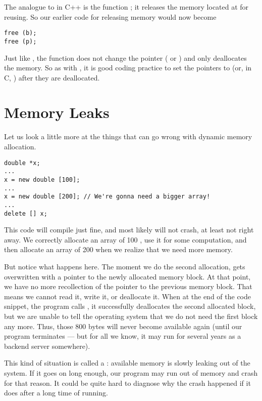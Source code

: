 \smallskip

The analogue to  in C++ is the function 
;
it releases the memory located at  for reusing.
So our earlier code for releasing memory would now become

\begin{verbatim}
free (b);
free (p);
\end{verbatim}

Just like , the function  does not change the
pointer ( or ) and only deallocates the memory.
So as with , it is good coding practice to set the
pointers to  (or, in C, ) after they are
deallocated.


\section{Memory Leaks}
Let us look a little more at the things that can go wrong with dynamic
memory allocation.

\begin{verbatim}
double *x;
...
x = new double [100];
...
x = new double [200]; // We're gonna need a bigger array!
...
delete [] x;
\end{verbatim}

This code will compile just fine, and most likely will not crash,
at least not right away.
We correctly allocate an array of 100 ,
use it for some computation,
and then allocate an array of 200  when we
realize that we need more memory.

But notice what happens here.
The moment we do the second allocation,  gets overwritten with
a pointer to the newly allocated memory block.
At that point, we have no more recollection of the pointer to
the previous memory block.
That means we cannot read it, write it, or deallocate it.
When at the end of the code snippet,
the program calls ,
it successfully deallocates the second allocated block,
but we are unable to tell the operating system that we do not need the
first block any more. 
Thus, those 800 bytes will never become available again
(until our program terminates --- but for all we know, it may run for
several years as a backend server somewhere).

This kind of situation is called a :
available memory is slowly leaking out of the system.
If it goes on long enough, our program may run out of memory and crash
for that reason. It could be quite hard to diagnose why the crash
happened if it does after a long time of running.

